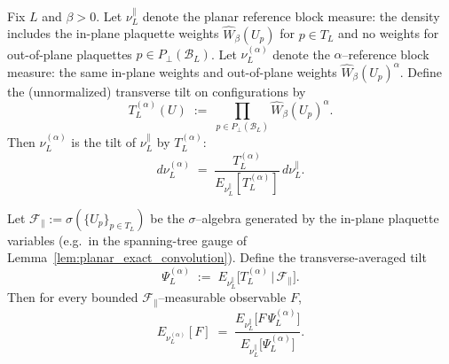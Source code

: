 \begin{lemma}\label{lem:routeC_effective_planar_tilt}
Fix $L$ and $\beta>0$. Let $\nu_L^{\parallel}$ denote the planar reference block measure: the density includes the in-plane plaquette weights $\widehat W_{\beta}(U_p)$ for $p\in T_L$ and no weights for out-of-plane plaquettes $p\in P_{\perp}(\mathcal B_L)$. Let $\nu_L^{(\alpha)}$ denote the $\alpha$--reference block measure: the same in-plane weights and out-of-plane weights $\widehat W_{\beta}(U_p)^{\alpha}$.
Define the (unnormalized) transverse tilt on configurations by
\begin{equation}\label{eq:routeC_transverse_tilt_T}
T_L^{(\alpha)}(U)\;:=\;\prod_{p\in P_{\perp}(\mathcal B_L)} \widehat W_{\beta}(U_p)^{\alpha}.
\end{equation}
Then $\nu_L^{(\alpha)}$ is the tilt of $\nu_L^{\parallel}$ by $T_L^{(\alpha)}$:
\begin{equation}\label{eq:routeC_block_tilt_form}
d\nu_L^{(\alpha)} \;=\; \frac{T_L^{(\alpha)}}{E_{\nu_L^{\parallel}}[T_L^{(\alpha)}]}\, d\nu_L^{\parallel}.
\end{equation}

Let $\mathscr F_{\parallel}:=\sigma(\{U_p\}_{p\in T_L})$ be the $\sigma$--algebra generated by the in-plane plaquette variables (e.g.\ in the spanning-tree gauge of Lemma~\ref{lem:planar_exact_convolution}).
Define the transverse-averaged tilt
\begin{equation}\label{eq:routeC_transverse_averaged_tilt_Psi}
\Psi_L^{(\alpha)} \;:=\; E_{\nu_L^{\parallel}}\!\big[T_L^{(\alpha)} \,\big|\, \mathscr F_{\parallel}\big].
\end{equation}
Then for every bounded $\mathscr F_{\parallel}$--measurable observable $F$,
\begin{equation}\label{eq:routeC_inplane_tilt_expectation}
E_{\nu_L^{(\alpha)}}[F] \;=\; \frac{E_{\nu_L^{\parallel}}\!\big[F\,\Psi_L^{(\alpha)}\big]}{E_{\nu_L^{\parallel}}\!\big[\Psi_L^{(\alpha)}\big]}.
\end{equation}


\end{lemma}
